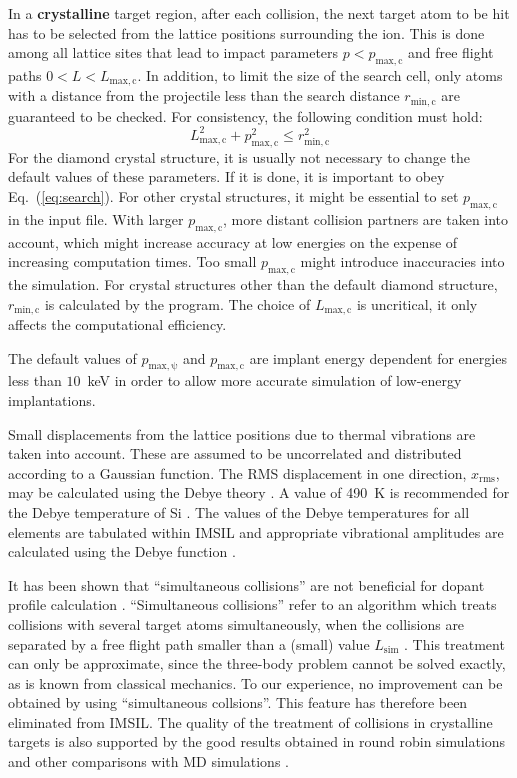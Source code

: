 In a \textbf{crystalline} target region, after each collision, the next target
atom to be hit has to be selected from the lattice positions surrounding the 
ion. This is done among all lattice sites that lead to impact parameters
$p < p_\mathrm{max,c}$ and free flight paths $0 < L < L_\mathrm{max,c}$. In
addition, to limit the size of the search cell, only atoms with a distance from
the projectile less than the search distance $r_\mathrm{min,c}$ are guaranteed
to be checked. For consistency, the following condition must hold:
%
\begin{equation}
   L_\mathrm{max,c}^2 + p_\mathrm{max,c}^2 \le r_\mathrm{min,c}^2   
   \label{eq:search}
\end{equation}
%
For the diamond crystal structure, it is usually not necessary to change the
default values of these parameters. If it is done, it is important to obey
Eq.~(\ref{eq:search}). For other crystal structures, it might be essential to
set $p_\mathrm{max,c}$ in the input file. With larger $p_\mathrm{max,c}$, more
distant collision partners are taken into account, which might increase accuracy
at low energies on the expense of increasing computation times. Too small
$p_\mathrm{max,c}$ might introduce inaccuracies into the simulation. For crystal
structures other than the default diamond structure, $r_\mathrm{min,c}$ is
calculated by the program. The choice of $L_\mathrm{max,c}$ is uncritical, it
only affects the computational efficiency.

The default values of $p_\mathrm{max,\psi}$ and $p_\mathrm{max,c}$ are implant
energy dependent for energies less than $10$~keV in order to allow more accurate
simulation of low-energy implantations.

Small displacements from the lattice positions due to thermal vibrations are
taken into account. These are assumed to be uncorrelated and distributed
according to a Gaussian function. The RMS displacement in one direction,
$x_\mathrm{rms}$, may be calculated using the Debye theory \cite{I7403}. A value
of 490~K is recommended for the Debye temperature of Si
\cite{hobler_role_1993,hobler_verification_1996}. The values of the Debye
temperatures for all elements are tabulated within IMSIL and appropriate
vibrational amplitudes are calculated using the Debye function \cite{I7403}.

It has been shown that ``simultaneous collisions'' are not beneficial
for dopant profile calculation \cite{hobler_study_1997,
hobler_modeling_1997,hobler_useful_2001}. ``Simultaneous collisions'' refer to
an algorithm which treats collisions with several target atoms simultaneously,
when the collisions are separated by a free flight path smaller than a (small)
value $L_\mathrm{sim}$ \cite{I7401}. This treatment can only be approximate,
since the three-body problem cannot be solved exactly, as is known from
classical mechanics. To our experience, no improvement can be obtained by using
``simultaneous collsions''. This feature has therefore been eliminated from
IMSIL.  The quality of the treatment of collisions in crystalline targets is
also supported by the good results obtained in round robin simulations
\cite{gartner_round_1995} and other comparisons with MD simulations
\cite{schlueter_absence_2020,hobler_channeling_2019}.

